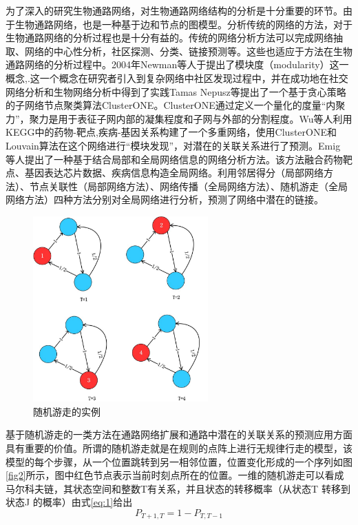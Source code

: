 为了深入的研究生物通路网络，对生物通路网络结构的分析是十分重要的环节。由于生物通路网络，也是一种基于边和节点的图模型。分析传统的网络的方法，对于生物通路网络的分析过程也是十分有益的。传统的网络分析方法可以完成网络抽取、网络的中心性分析，社区探测、分类、链接预测等。这些也适应于方法在生物通路网络的分析过程中。2004年Newman\cite{newman2006modularity}等人于提出了模块度（modularity）这一概念,.这一个概念在研究者引入到复杂网络中社区发现过程中，并在成功地在社交网络分析和生物网络分析中得到了实践Tamas Nepusz\cite{nepusz2012detecting}等提出了一个基于贪心策略的子网络节点聚类算法ClusterONE。ClusterONE通过定义一个量化的度量“内聚力”，聚力是用于表征子网内部的凝集程度和子网与外部的分割程度。Wu等人利用KEGG\cite{kanehisa2008kegg}中的药物-靶点,疾病-基因关系构建了一个多重网络，使用ClusterONE和Louvain\cite{blondel2008fast}算法在这个网络进行“模块发现”，对潜在的关联关系进行了预测。Emig \cite{emig2013drug}等人提出了一种基于结合局部和全局网络信息的网络分析方法。该方法融合药物靶点、基因表达芯片数据、疾病信息构造全局网络。利用邻居得分（局部网络方法）、节点关联性（局部网络方法）、网络传播（全局网络方法）、随机游走（全局网络方法）四种方法分别对全局网络进行分析，预测了网络中潜在的链接。

\begin{figure}
\centering
\includegraphics[width = 0.6\textwidth]{rw}
\caption[fig2]{随机游走的实例}
\end{figure}


基于随机游走的一类方法在通路网络扩展和通路中潜在的关联关系的预测应用方面具有重要的价值。所谓的随机游走就是在规则的点阵上进行无规律行走的模型，该模型的每个步骤，从一个位置跳转到另一相邻位置，位置变化形成的一个序列如图\ref{fig2}所示，图中红色节点表示当前时刻点所在的位置。一维的随机游走可以看成马尔科夫链，其状态空间和整数T有关系，并且状态的转移概率（从状态T 转移到状态J 的概率）由式\ref{eq:1}给出
\begin{equation}\label{eq:1}
	P_{T+1,T} = 1-P_{T,T-1}
\end{equation}

